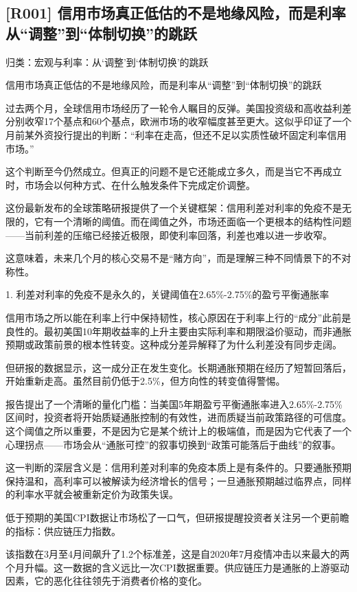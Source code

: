 \documentclass[11pt]{ctexart}
\begin{document}
\subsection{[R001] 信用市场真正低估的不是地缘风险，而是利率从“调整”到“体制切换”的跳跃}
{\small\color{refgray}归类：宏观与利率：从‘调整’到‘体制切换’的跳跃}

信用市场真正低估的不是地缘风险，而是利率从“调整”到“体制切换”的跳跃

过去两个月，全球信用市场经历了一轮令人瞩目的反弹。美国投资级和高收益利差分别收窄17个基点和60个基点，欧洲市场的收窄幅度甚至更大。这似乎印证了一个月前某外资投行提出的判断：“利率在走高，但还不足以实质性破坏固定利率信用市场。”

这个判断至今仍然成立。但真正的问题不是它还能成立多久，而是当它不再成立时，市场会以何种方式、在什么触发条件下完成定价调整。

这份最新发布的全球策略研报提供了一个关键框架：信用利差对利率的免疫不是无限的，它有一个清晰的阈值。而在阈值之外，市场还面临一个更根本的结构性问题——当前利差的压缩已经接近极限，即使利率回落，利差也难以进一步收窄。

这意味着，未来几个月的核心交易不是“赌方向”，而是理解三种不同情景下的不对称性。

1. 利差对利率的免疫不是永久的，关键阈值在2.65\%-2.75\%的盈亏平衡通胀率

信用市场之所以能在利率上行中保持韧性，核心原因在于利率上行的“成分”此前是良性的。最初美国10年期收益率的上升主要由实际利率和期限溢价驱动，而非通胀预期或政策前景的根本性转变。这种成分差异解释了为什么利差没有同步走阔。

但研报的数据显示，这一成分正在发生变化。长期通胀预期在经历了短暂回落后，开始重新走高。虽然目前仍低于2.5\%，但方向性的转变值得警惕。

报告提出了一个清晰的量化门槛：当美国5年期盈亏平衡通胀率进入2.65\%-2.75\%区间时，投资者将开始质疑通胀控制的有效性，进而质疑当前政策路径的可信度。这个阈值之所以重要，不是因为它是某个统计上的极端值，而是因为它代表了一个心理拐点——市场会从“通胀可控”的叙事切换到“政策可能落后于曲线”的叙事。

这一判断的深层含义是：信用利差对利率的免疫本质上是有条件的。只要通胀预期保持温和，高利率可以被解读为经济增长的信号；一旦通胀预期越过临界点，同样的利率水平就会被重新定价为政策失误。

低于预期的美国CPI数据让市场松了一口气，但研报提醒投资者关注另一个更前瞻的指标：供应链压力指数。

该指数在3月至4月间飙升了1.2个标准差，这是自2020年7月疫情冲击以来最大的两个月升幅。这一数据的含义远比一次CPI数据重要。供应链压力是通胀的上游驱动因素，它的恶化往往领先于消费者价格的变化。
\end{document}
